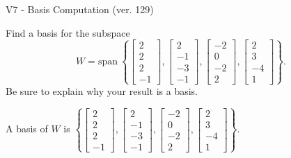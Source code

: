 \begin{exercise}
  \begin{exerciseTitle}V7 - Basis Computation (ver. 129)\end{exerciseTitle}
  \begin{exerciseStatement}
    Find a basis for the subspace 
\[W=\mathrm{span}\ \left\{\left[\begin{array}{r}
2 \\
2 \\
2 \\
-1
\end{array}\right] , \left[\begin{array}{r}
2 \\
-1 \\
-3 \\
-1
\end{array}\right] , \left[\begin{array}{r}
-2 \\
0 \\
-2 \\
2
\end{array}\right] , \left[\begin{array}{r}
2 \\
3 \\
-4 \\
1
\end{array}\right]\right\}.\]
 Be sure to explain why your result is a basis.


  \end{exerciseStatement}
  \begin{exerciseAnswer}
   A basis of \(W\) is  \(\left\{\left[\begin{array}{r}
2 \\
2 \\
2 \\
-1
\end{array}\right] , \left[\begin{array}{r}
2 \\
-1 \\
-3 \\
-1
\end{array}\right] , \left[\begin{array}{r}
-2 \\
0 \\
-2 \\
2
\end{array}\right] , \left[\begin{array}{r}
2 \\
3 \\
-4 \\
1
\end{array}\right]\right\}\).
  


  \end{exerciseAnswer}
\end{exercise}